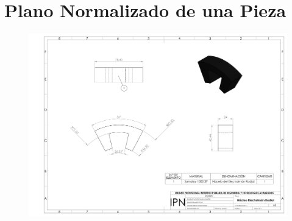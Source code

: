 \chapter{Plano Normalizado de una Pieza}

\newpage

\begin{figure}[t]
\centering
	\includegraphics[width=\textheight, height=\textwidth, angle=270]{images/Apendices/Plano_Nucleo}
\end{figure}